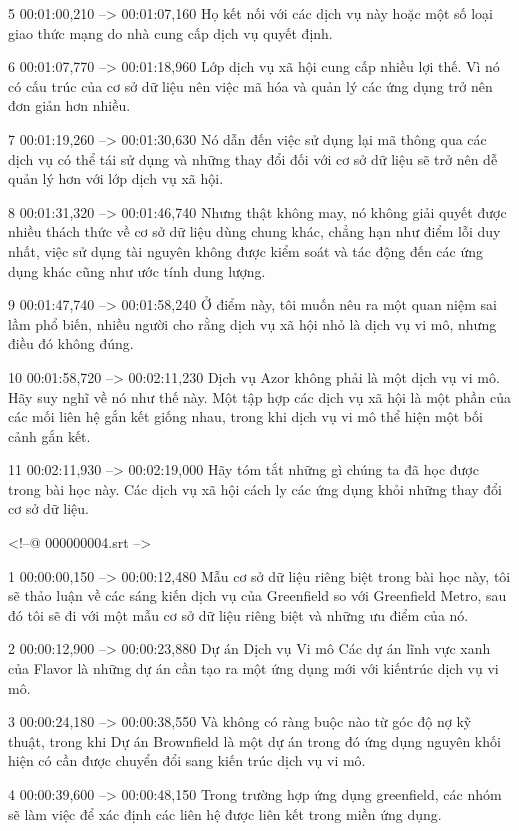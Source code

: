 5
00:01:00,210 --> 00:01:07,160
Họ kết nối với các dịch vụ này hoặc một số loại giao thức mạng do nhà cung cấp dịch vụ quyết định.

6
00:01:07,770 --> 00:01:18,960
Lớp dịch vụ xã hội cung cấp nhiều lợi thế.  Vì nó có cấu trúc của cơ sở dữ liệu nên việc mã hóa và quản lý các ứng dụng trở nên đơn giản hơn nhiều.

7
00:01:19,260 --> 00:01:30,630
Nó dẫn đến việc sử dụng lại mã thông qua các dịch vụ có thể tái sử dụng và những thay đổi đối với cơ sở dữ liệu sẽ trở nên dễ quản lý hơn với lớp dịch vụ xã hội.

8
00:01:31,320 --> 00:01:46,740
Nhưng thật không may, nó không giải quyết được nhiều thách thức về cơ sở dữ liệu dùng chung khác, chẳng hạn như điểm lỗi duy nhất, việc sử dụng tài nguyên không được kiểm soát và tác động đến các ứng dụng khác cũng như ước tính dung lượng.

9
00:01:47,740 --> 00:01:58,240
Ở điểm này, tôi muốn nêu ra một quan niệm sai lầm phổ biến, nhiều người cho rằng dịch vụ xã hội nhỏ là dịch vụ vi mô, nhưng điều đó không đúng.

10
00:01:58,720 --> 00:02:11,230
Dịch vụ Azor không phải là một dịch vụ vi mô.  Hãy suy nghĩ về nó như thế này.  Một tập hợp các dịch vụ xã hội là một phần của các mối liên hệ gắn kết giống nhau, trong khi dịch vụ vi mô thể hiện một bối cảnh gắn kết.

11
00:02:11,930 --> 00:02:19,000
Hãy tóm tắt những gì chúng ta đã học được trong bài học này.  Các dịch vụ xã hội cách ly các ứng dụng khỏi những thay đổi cơ sở dữ liệu.

<!--@ 000000004.srt -->

1
00:00:00,150 --> 00:00:12,480
Mẫu cơ sở dữ liệu riêng biệt trong bài học này, tôi sẽ thảo luận về các sáng kiến ​​dịch vụ của Greenfield so với Greenfield Metro, sau đó tôi sẽ đi với một mẫu cơ sở dữ liệu riêng biệt và những ưu điểm của nó.

2
00:00:12,900 --> 00:00:23,880
Dự án Dịch vụ Vi mô Các dự án lĩnh vực xanh của Flavor là những dự án cần tạo ra một ứng dụng mới với kiến ​​trúc dịch vụ vi mô.

3
00:00:24,180 --> 00:00:38,550
Và không có ràng buộc nào từ góc độ nợ kỹ thuật, trong khi Dự án Brownfield là một dự án trong đó ứng dụng nguyên khối hiện có cần được chuyển đổi sang kiến ​​trúc dịch vụ vi mô.

4
00:00:39,600 --> 00:00:48,150
Trong trường hợp ứng dụng greenfield, các nhóm sẽ làm việc để xác định các liên hệ được liên kết trong miền ứng dụng.


